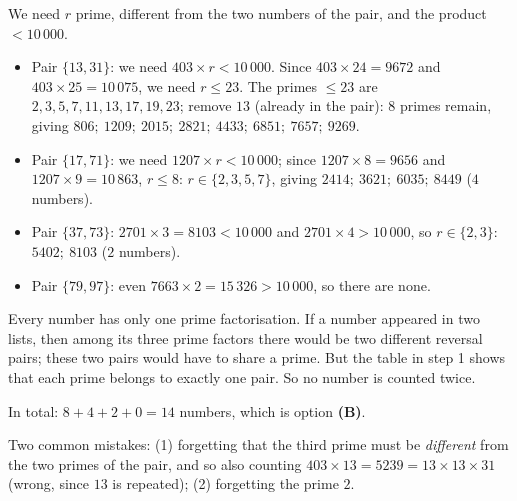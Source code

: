 {
We need $r$ prime, different from the two numbers of the pair, and the product $<10\,000$.
\begin{itemize}[leftmargin=1.2em,itemsep=1pt,topsep=2pt]
\item Pair $\{13,31\}$: we need $403\times r<10\,000$. Since $403\times24=9672$ and $403\times25=10\,075$, we need $r\le23$.
The primes $\le23$ are $2,3,5,7,11,13,17,19,23$; remove $13$ (already in the pair): $8$ primes remain, giving
$806;\ 1209;\ 2015;\ 2821;\ 4433;\ 6851;\ 7657;\ 9269$.
\item Pair $\{17,71\}$: we need $1207\times r<10\,000$; since $1207\times8=9656$ and $1207\times9=10\,863$, $r\le8$:
$r\in\{2,3,5,7\}$, giving $2414;\ 3621;\ 6035;\ 8449$ ($4$ numbers).
\item Pair $\{37,73\}$: $2701\times3=8103<10\,000$ and $2701\times4>10\,000$, so $r\in\{2,3\}$: $5402;\ 8103$ ($2$ numbers).
\item Pair $\{79,97\}$: even $7663\times2=15\,326>10\,000$, so there are none.
\end{itemize}

\begin{proofbox}Every number has only one prime factorisation. If a number appeared in two lists, then among its three prime factors there
would be two different reversal pairs; these two pairs would have to share a prime. But the table in step 1 shows that each prime belongs
to exactly one pair. So no number is counted twice.\end{proofbox}
In total: $8+4+2+0=14$ numbers, which is option \textbf{(B)}.
\begin{warnbox}Two common mistakes: (1) forgetting that the third prime must be \emph{different} from the two primes of the pair, and so
also counting $403\times13=5239=13\times13\times31$ (wrong, since $13$ is repeated); (2) forgetting the prime $2$.\end{warnbox}
}

